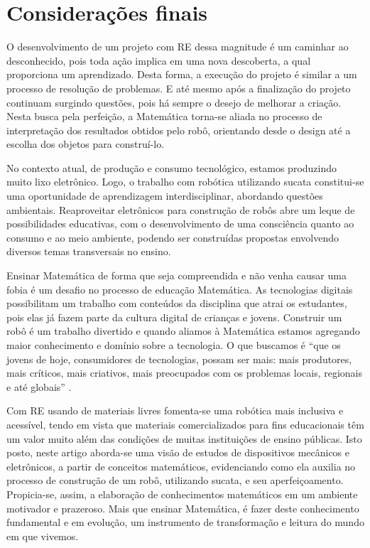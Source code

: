 \documentclass{textolivre-html}
\begin{document}
\section{Considerações finais}\label{sec-considera}
O desenvolvimento de um projeto com RE dessa magnitude é um caminhar ao
desconhecido, pois toda ação implica em uma nova descoberta, a qual proporciona
um aprendizado. Desta forma, a execução do projeto é similar a um processo de
resolução de problemas. E até mesmo após a finalização do projeto continuam
surgindo questões, pois há sempre o desejo de melhorar a criação. Nesta busca
pela perfeição, a Matemática torna-se aliada no processo de interpretação dos
resultados obtidos pelo robô, orientando desde o design até a escolha dos
objetos para construí-lo.

No contexto atual, de produção e consumo tecnológico, estamos produzindo muito
lixo eletrônico. Logo, o trabalho com robótica utilizando sucata constitui-se
uma oportunidade de aprendizagem interdisciplinar, abordando questões
ambientais. Reaproveitar eletrônicos para construção de robôs abre um leque de
possibilidades educativas, com o desenvolvimento de uma consciência quanto ao
consumo e ao meio ambiente, podendo ser construídas propostas envolvendo
diversos temas transversais no ensino.

Ensinar Matemática de forma que seja compreendida e não venha causar uma fobia
é um desafio no processo de educação Matemática. As tecnologias digitais
possibilitam um trabalho com conteúdos da disciplina que atrai os estudantes,
pois elas já fazem parte da cultura digital de crianças e jovens. Construir um
robô é um trabalho divertido e quando aliamos à Matemática estamos agregando
maior conhecimento e domínio sobre a tecnologia. O que buscamos é “que os
jovens de hoje, consumidores de tecnologias, possam ser mais: mais produtores,
mais críticos, mais criativos, mais preocupados com os problemas locais,
regionais e até globais” \cite[p. 286]{barbosa2016}.

Com RE usando de materiais livres fomenta-se uma robótica mais inclusiva e
acessível, tendo em vista que materiais comercializados para fins educacionais
têm um valor muito além das condições de muitas instituições de ensino
públicas. Isto posto, neste artigo aborda-se uma visão de estudos de
dispositivos mecânicos e eletrônicos, a partir de conceitos matemáticos,
evidenciando como ela auxilia no processo de construção de um robô, utilizando
sucata, e seu aperfeiçoamento. Propicia-se, assim, a elaboração de
conhecimentos matemáticos em um ambiente motivador e prazeroso. Mais que
ensinar Matemática, é fazer deste conhecimento fundamental e em evolução, um
instrumento de transformação e leitura do mundo em que vivemos.
\end{document}
